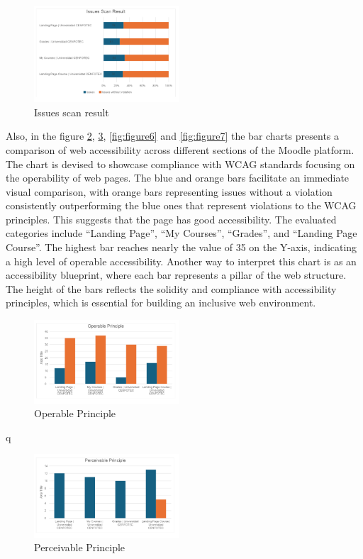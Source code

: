 \documentclass{IEEEtran}
\begin{document}
\begin{figure}[H]
    \includegraphics[width=0.48\textwidth]{images/scanResult.png}
    \caption{Issues scan result}
    \label{fig:figure3}
\end{figure}


Also, in the figure \ref{fig:figure4}, \ref{fig:figure5}, \ref{fig:figure6} and \ref{fig:figure7} the bar charts presents a comparison of web accessibility across different sections of the Moodle platform. The chart is devised to showcase compliance with WCAG standards focusing on the operability of web pages. The blue and orange bars facilitate an immediate visual comparison, with orange bars representing issues without a violation consistently outperforming the blue ones that represent violations to the WCAG principles. This suggests that the page has good accessibility. The evaluated categories include “Landing Page”, “My Courses”, “Grades”, and “Landing Page Course”. The highest bar reaches nearly the value of 35 on the Y-axis, indicating a high level of operable accessibility. Another way to interpret this chart is as an accessibility blueprint, where each bar represents a pillar of the web structure. The height of the bars reflects the solidity and compliance with accessibility principles, which is essential for building an inclusive web environment.
\begin{figure}[H]
    \includegraphics[width=0.48\textwidth]{images/operablePrinciple.png}
    \caption{Operable Principle}
    \label{fig:figure4}
\end{figure}
q
\begin{figure}[H]
    \includegraphics[width=0.48\textwidth]{images/perceivablePrinciple.png}
    \caption{Perceivable Principle}
    \label{fig:figure5}
\end{figure}
\end{document}
